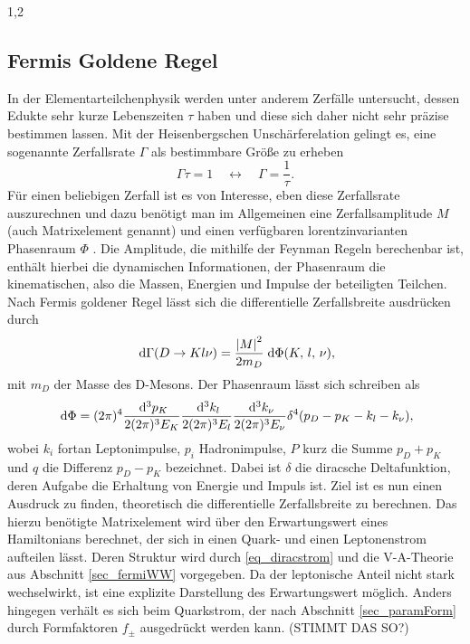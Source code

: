 \documentclass[11pt,a4paper,twoside]{report}
\begin{document}
\begin{spacing}{1,2}
\subsection{Fermis Goldene Regel}
\label{sec_fermi}
In der Elementarteilchenphysik werden unter anderem Zerfälle untersucht, dessen Edukte sehr kurze Lebenszeiten $\tau$ haben und diese sich daher nicht sehr präzise
bestimmen lassen. Mit der Heisenbergschen Unschärferelation gelingt es, eine sogenannte Zerfallsrate $\Gamma$ als bestimmbare Größe zu erheben
\begin{equation}
 \Gamma \tau = 1 \quad \leftrightarrow\quad  \Gamma = \frac{1}{\tau}.
\end{equation} 
Für einen beliebigen Zerfall ist es von Interesse, eben diese Zerfallsrate auszurechnen und dazu
benötigt man im Allgemeinen eine Zerfallsamplitude $M$ (auch Matrixelement genannt) und einen verfügbaren lorentzinvarianten Phasenraum $\Phi$ 
\cite{TeilFortgeschr}\cite{Griffiths}. Die Amplitude,
die mithilfe der Feynman Regeln berechenbar ist, enthält hierbei die dynamischen Informationen, der Phasenraum die kinematischen, also die Massen, Energien
und Impulse der beteiligten Teilchen. Nach Fermis goldener Regel lässt sich die differentielle Zerfallsbreite ausdrücken durch
\begin{equation}
 \; \mathrm{d} \Gamma(D \rightarrow K l \nu) = \frac{\left|M\right|^2}{2m_D}\; \mathrm{d} \Phi(K, \,l,\, \nu),
 \label{eq_fermirule}
\end{equation}
mit $m_D$ der Masse des D-Mesons. Der Phasenraum lässt sich schreiben als
\begin{equation}
 \; \mathrm{d} \Phi = (2\pi)^4 \frac{\; \mathrm{d}^3p_K}{2(2\pi)^3E_K}\frac{\; \mathrm{d}^3k_l}{2(2\pi)^3E_l}\frac{\; \mathrm{d}^3k_\nu}{2(2\pi)^3E_\nu}\delta^4(p_D-p_K-k_l-k_\nu),
\end{equation}
wobei $k_i$ fortan Leptonimpulse, $p_i$ Hadronimpulse, $P$ kurz die Summe $p_D+p_K$ und $q$ die Differenz $p_D - p_K$ bezeichnet. 
Dabei ist $\delta$ die diracsche Deltafunktion, deren Aufgabe die Erhaltung von Energie und Impuls ist. Ziel ist es nun einen Ausdruck zu finden,
theoretisch die differentielle Zerfallsbreite zu berechnen. Das hierzu benötigte Matrixelement wird über den Erwartungswert eines Hamiltonians berechnet,
der sich in einen Quark- und einen Leptonenstrom aufteilen lässt. Deren Struktur wird durch \eqref{eq_diracstrom} und die V-A-Theorie aus Abschnitt 
\ref{sec_fermiWW} vorgegeben. Da der leptonische Anteil nicht stark wechselwirkt, ist eine explizite Darstellung des Erwartungswert möglich. Anders hingegen
verhält es sich beim Quarkstrom, der nach Abschnitt \ref{sec_paramForm} durch Formfaktoren $f_\pm$ ausgedrückt werden kann. (STIMMT DAS SO?)

\end{spacing}
\end{document}
